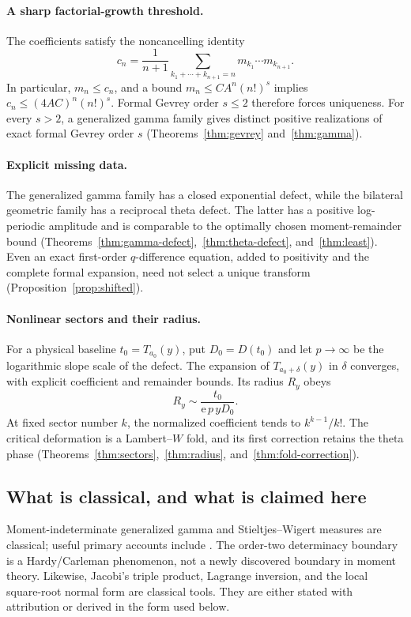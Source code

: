 \documentclass[11pt,a4paper]{article}
\numberwithin{equation}{section}
\theoremstyle{definition}
\theoremstyle{remark}
\newcommand{\ee}{\mathrm e}
\begin{document}
\paragraph{A sharp factorial-growth threshold.}
The coefficients satisfy the noncancelling identity
\begin{equation}
 c_n=\frac1{n+1}
 \sum_{k_1+\cdots+k_{n+1}=n}m_{k_1}\cdots m_{k_{n+1}}.
 \label{eq:intro-composition}
\end{equation}
In particular, \(m_n\le c_n\), and a bound
\(m_n\le CA^n(n!)^s\) implies
\(c_n\le(4AC)^n(n!)^s\). Formal Gevrey order \(s\le2\) therefore forces
uniqueness. For every \(s>2\), a generalized gamma family gives distinct
positive realizations of exact formal Gevrey order \(s\)
(Theorems~\ref{thm:gevrey} and~\ref{thm:gamma}).

\paragraph{Explicit missing data.}
The generalized gamma family has a closed exponential defect, while the
bilateral geometric family has a reciprocal theta defect. The latter
has a positive log-periodic amplitude and is comparable to the
optimally chosen moment-remainder bound
(Theorems~\ref{thm:gamma-defect},~\ref{thm:theta-defect},
and~\ref{thm:least}). Even an exact first-order \(q\)-difference equation,
added to positivity and the complete formal expansion, need not select a
unique transform (Proposition~\ref{prop:shifted}).

\paragraph{Nonlinear sectors and their radius.}
For a physical baseline \(t_0=T_{a_0}(y)\), put \(D_0=D(t_0)\) and let
\(p\to\infty\) be the logarithmic slope scale of the defect. The expansion
of \(T_{a_0+\delta}(y)\) in \(\delta\) converges, with explicit coefficient
and remainder bounds. Its radius \(R_y\) obeys
\begin{equation}
 R_y\sim\frac{t_0}{\ee\,p\,yD_0}.
 \label{eq:intro-radius}
\end{equation}
At fixed sector number \(k\), the normalized coefficient tends to
\(k^{k-1}/k!\). The critical deformation is a Lambert--\(W\) fold, and
its first correction retains the theta phase
(Theorems~\ref{thm:sectors},~\ref{thm:radius}, and~\ref{thm:fold-correction}).

\subsection{What is classical, and what is claimed here}
Moment-indeterminate generalized gamma and Stieltjes--Wigert measures
are classical; useful primary accounts include
\cite{lin-stoyanov,chihara,christiansen,christiansen-koelink}.
The order-two determinacy boundary is a Hardy/Carleman phenomenon,
not a newly discovered boundary in moment theory. Likewise, Jacobi's
triple product, Lagrange inversion, and the local square-root normal form
are classical tools. They are either stated with attribution or derived
in the form used below.
\end{document}
